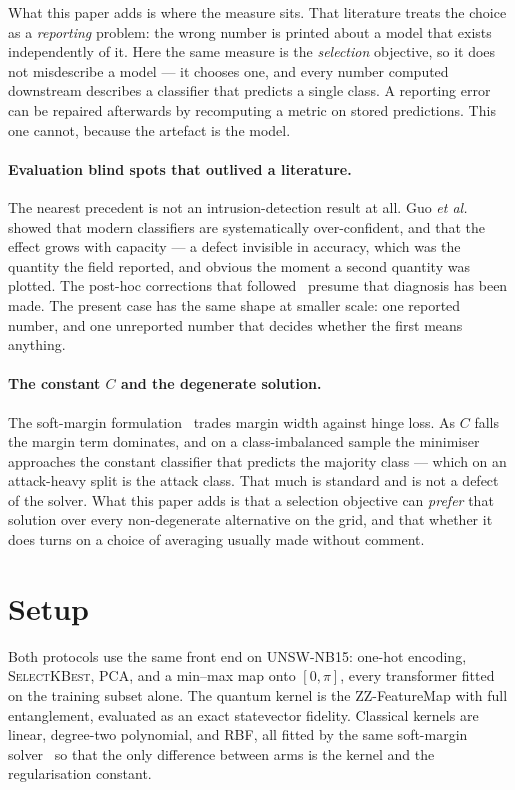 \documentclass[runningheads]{llncs}
\newcommand{\ZZ}{\textsf{ZZ}}
\begin{document}
What this paper adds is where the measure sits. That literature treats the
choice as a \emph{reporting} problem: the wrong number is printed about a
model that exists independently of it. Here the same measure is the
\emph{selection} objective, so it does not misdescribe a model --- it
chooses one, and every number computed downstream describes a classifier
that predicts a single class. A reporting error can be repaired afterwards
by recomputing a metric on stored predictions. This one cannot, because the
artefact is the model.

\paragraph{Evaluation blind spots that outlived a literature.}
The nearest precedent is not an intrusion-detection result at all. Guo
\emph{et al.}~\cite{guo2017calibration} showed that modern classifiers are
systematically over-confident, and that the effect grows with capacity --- a
defect invisible in accuracy, which was the quantity the field reported, and
obvious the moment a second quantity was plotted. The post-hoc corrections
that followed~\cite{platt1999svm} presume that diagnosis has been made. The
present case has the same shape at smaller scale: one reported number, and
one unreported number that decides whether the first means anything.

\paragraph{The constant $C$ and the degenerate solution.}
The soft-margin formulation~\cite{cortes1995svm} trades margin width against
hinge loss. As $C$ falls the margin term dominates, and on a class-imbalanced
sample the minimiser approaches the constant classifier that predicts the
majority class --- which on an attack-heavy split is the attack class. That
much is standard and is not a defect of the solver. What this paper adds is
that a selection objective can \emph{prefer} that solution over every
non-degenerate alternative on the grid, and that whether it does turns on a
choice of averaging usually made without comment.

\section{Setup}\label{sec:setup}

Both protocols use the same front end on UNSW-NB15: one-hot encoding,
\textsc{SelectKBest}, PCA, and a min--max map onto $[0,\pi]$, every
transformer fitted on the training subset alone. The quantum kernel is the
\ZZ{}-FeatureMap with full entanglement, evaluated as an exact statevector
fidelity. Classical kernels are linear, degree-two polynomial, and RBF, all
fitted by the same soft-margin solver~\cite{cortes1995svm} so that the only difference between
arms is the kernel and the regularisation constant.
\end{document}
